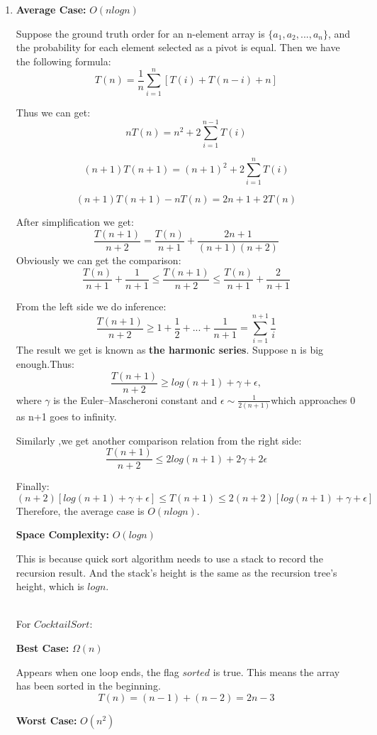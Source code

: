 \documentclass[12pt,a4paper]{article}
\makeatletter
\newtheorem*{solution}{Solution}
\theoremstyle{definition}
\renewenvironment{solution}[1][Solution] {\par\pushQED{\qed}\normalfont\topsep6\p@\@plus6\p@\relax\trivlist\item[\hskip\labelsep\bfseries#1\@addpunct{.}]\ignorespaces}{\popQED\endtrivlist\@endpefalse} \makeatother
\makeatother
\begin{document}
\begin{enumerate}
\begin{enumerate}
\begin{solution}
\textbf{Average Case: }$O(nlogn)$

Suppose the ground truth order for an n-element array is $\{ a_1, a_2, ..., a_n\}$, and the probability for each element selected as a pivot is equal. Then we have the following formula:
$$
\displaystyle T(n) = \frac{1}{n} \sum_{i=1}^{n}[ T(i) + T(n-i) + n]
$$

Thus we can get:
$$
\displaystyle nT(n) = n^2 + 2 \sum_{i=1}^{n-1}T(i)
$$

$$
\displaystyle (n+1)T(n+1) = (n+1)^2 + 2 \sum_{i=1}^{n}T(i)
$$

$$
(n+1)T(n+1) - nT(n) = 2n+1 + 2T(n)
$$

After simplification we get:
$$
\frac{T(n+1)}{n+2} = \frac{T(n)}{n+1} + \frac{2n+1}{(n+1)(n+2)}
$$
Obviously we can get the comparison:
$$
 \frac{T(n)}{n+1} + \frac{1}{n+1}  \leq \frac{T(n+1)}{n+2} \leq \frac{T(n)}{n+1} + \frac{2}{n+1}
$$

From the left side we do inference:
$$
\displaystyle \frac{T(n+1)}{n+2} \geq 1 + \frac{1}{2} + ... + \frac{1}{n+1} = \sum_{i=1}^{n+1}\frac{1}{i}
$$
The result we get is known as \textbf{the harmonic series}. Suppose n is big enough.Thus: 
$$
\displaystyle \frac{T(n+1)}{n+2} \geq log(n+1) + \gamma +\epsilon,
$$
where $\gamma$ is the Euler–Mascheroni constant and  $\epsilon \sim \frac{1}{2(n+1)} $which approaches 0 as n+1 goes to infinity.

Similarly ,we get another comparison relation from the right side:
$$
\displaystyle \frac{T(n+1)}{n+2} \leq 2log(n+1) + 2\gamma +2\epsilon
$$

Finally:
$$
(n+2)[log(n+1) + \gamma +\epsilon] \leq T(n+1) \leq 2(n+2)[log(n+1) + \gamma +\epsilon]
$$
Therefore, the average case is $O(nlogn)$.




\textbf{Space Complexity: }$O(logn)$

This is because quick sort algorithm needs to use a stack to record the recursion result. And the stack's height is the same as the recursion tree's height, which is $logn$.

~\\
For $CocktailSort$:

\textbf{Best Case: }$\Omega(n)$

Appears when one loop ends, the flag $sorted$ is true. This means the array has been sorted in the beginning.
$$
T(n) = (n-1) + (n-2) = 2n-3
$$

\textbf{Worst Case: }$O(n^2)$


\end{solution}
\end{enumerate}
\end{enumerate}
\end{document}
